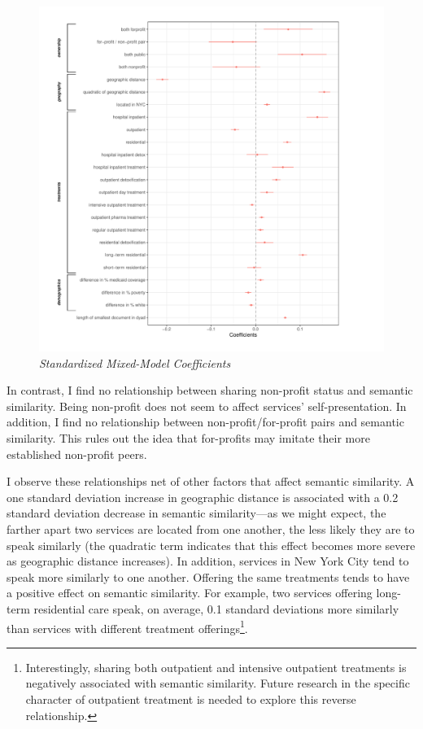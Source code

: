 \documentclass[
  12pt,
]{article}
\begin{document}
\begin{figure}

{\centering \includegraphics{full_paper_files/figure-latex/unnamed-chunk-5-1} 

}

\caption{\textit{Standardized Mixed-Model Coefficients}}\label{fig:unnamed-chunk-5}
\end{figure}

\vspace{12pt}

In contrast, I find no relationship between sharing non-profit status and semantic similarity. Being non-profit does not seem to affect services' self-presentation. In addition, I find no relationship between non-profit/for-profit pairs and semantic similarity. This rules out the idea that for-profits may imitate their more established non-profit peers.

\vspace{12pt}

I observe these relationships net of other factors that affect semantic similarity. A one standard deviation increase in geographic distance is associated with a 0.2 standard deviation decrease in semantic similarity---as we might expect, the farther apart two services are located from one another, the less likely they are to speak similarly (the quadratic term indicates that this effect becomes more severe as geographic distance increases). In addition, services in New York City tend to speak more similarly to one another. Offering the same treatments tends to have a positive effect on semantic similarity. For example, two services offering long-term residential care speak, on average, 0.1 standard deviations more similarly than services with different treatment offerings\footnote{Interestingly, sharing both outpatient and intensive outpatient treatments is negatively associated with semantic similarity. Future research in the specific character of outpatient treatment is needed to explore this reverse relationship.}.
\end{document}
